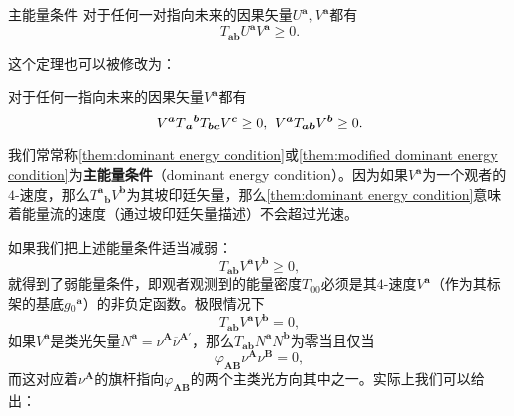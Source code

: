 \begin{them}[label={them:dominant energy condition}]{主能量条件}
	对于任何一对指向未来的因果矢量$U^{\boldsymbol{a}} ,V^{\boldsymbol{a}}$都有
	\begin{equation*}
		T_{\boldsymbol{ab}} U^{\boldsymbol{a}} V^{\boldsymbol{a}} \geq 0.
	\end{equation*}
\end{them}

这个定理也可以被修改为：
\begin{them}[label={them:modified dominant energy condition}]{}
	对于任何一指向未来的因果矢量$V^{\boldsymbol{a}}$都有
	\begin{equation*}
		V^{\boldsymbol{a}} T{_{\boldsymbol{a}}}^{\boldsymbol{b}} T_{\boldsymbol{bc}} V^{\boldsymbol{c}} \geq 0,\kern+0.4em V^{\boldsymbol{a}} T_{\boldsymbol{ab}} V^{\boldsymbol{b}} \geq 0.
	\end{equation*}
\end{them}

我们常常称\ref{them:dominant energy condition}或\ref{them:modified dominant energy condition}为\textbf{主能量条件}（dominant energy condition）。因为如果$V^{\boldsymbol{a}}$为一个观者的$4$-速度，那么$T^{\boldsymbol{a}}{}_{\boldsymbol{b}} V^{\boldsymbol{b}}$为其坡印廷矢量，那么\ref{them:dominant energy condition}意味着能量流的速度（通过坡印廷矢量描述）不会超过光速。

如果我们把上述能量条件适当减弱：
\begin{equation*}
	T_{\boldsymbol{ab}} V^{\boldsymbol{a}} V^{\boldsymbol{b}} \geq 0,
\end{equation*}
就得到了弱能量条件，即观者观测到的能量密度$T_{00}$必须是其$4$-速度$V^{\boldsymbol{a}}$（作为其标架的基底$g{_{0}}^{\boldsymbol{a}}$）的非负定函数。极限情况下
\begin{equation*}
	T_{\boldsymbol{ab}} V^{\boldsymbol{a}} V^{\boldsymbol{b}} =0,
\end{equation*}
如果$V^{\boldsymbol{a}}$是类光矢量$N^{\boldsymbol{a}} =\nu ^{\boldsymbol{A}}\overline{\nu }^{\boldsymbol{A} '}$，那么$T_{\boldsymbol{ab}} N^{\boldsymbol{a}} N^{\boldsymbol{b}}$为零当且仅当
\begin{equation*}
	\varphi _{\boldsymbol{AB}} \nu ^{\boldsymbol{A}} \nu ^{\boldsymbol{B}} =0,
\end{equation*}
而这对应着$\nu ^{\boldsymbol{A}}$的旗杆指向$\varphi _{\boldsymbol{AB}}$的两个主类光方向其中之一。实际上我们可以给出：

